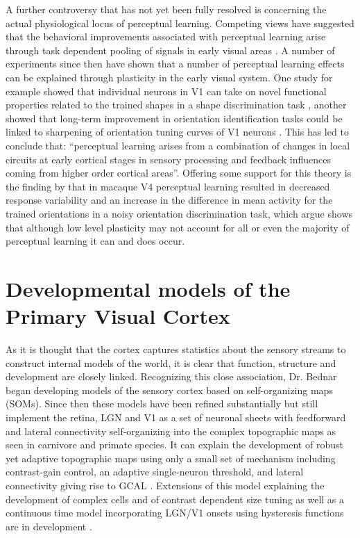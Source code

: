 A further controversy that has not yet been fully resolved is
concerning the actual physiological locus of perceptual
learning. Competing views have suggested that the behavioral
improvements associated with perceptual learning arise through task
dependent pooling of signals in early visual areas
\citep{Ghose2002}. A number of experiments since then have shown that
a number of perceptual learning effects can be explained through
plasticity in the early visual system. One study for example showed
that individual neurons in V1 can take on novel functional properties
related to the trained shapes in a shape discrimination task
\citep{Li2006}, another showed that long-term improvement in
orientation identification tasks could be linked to sharpening of
orientation tuning curves of V1 neurons \citep{Schoups2001}. This has
led \cite{Gilbert2001} to conclude that: ``perceptual learning arises
from a combination of changes in local circuits at early cortical
stages in sensory processing and feedback influences coming from
higher order cortical areas''. Offering some support for this theory
is the finding by \cite{Zivari2011} that in macaque V4 perceptual
learning resulted in decreased response variability and an increase in
the difference in mean activity for the trained orientations in a
noisy orientation discrimination task, which \cite{Seitz2011} argue
shows that although low level plasticity may not account for all or
even the majority of perceptual learning it can and does occur.

\section{Developmental models of the Primary Visual Cortex}

As it is thought that the cortex captures statistics about the sensory
streams to construct internal models of the world, it is clear that
function, structure and development are closely linked. Recognizing
this close association, Dr. Bednar began developing models of the
sensory cortex \citep{Bednar2003} based on self-organizing maps
(SOMs). Since then these models have been refined substantially but
still implement the retina, LGN and V1 as a set of neuronal sheets
with feedforward and lateral connectivity self-organizing into the
complex topographic maps as seen in carnivore and primate species. It
can explain the development of robust yet adaptive topographic maps
using only a small set of mechanism including contrast-gain control,
an adaptive single-neuron threshold, and lateral connectivity giving
rise to GCAL \citep{Law2011}. Extensions of this model explaining the
development of complex cells and of contrast dependent size tuning
\citep{Antolik2011} as well as a continuous time model incorporating
LGN/V1 onsets using hysteresis functions are in development
\citep{Stevens2011}.

